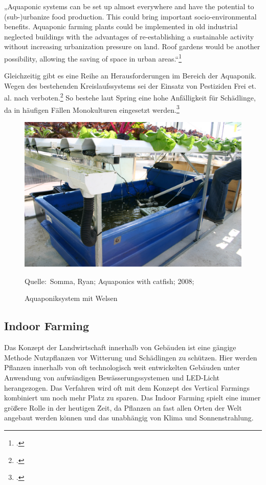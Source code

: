 \documentclass{scrartcl}
\newcommand*{\Bildquelle}[1]{\par\raggedleft\footnotesize Quelle:~#1}
\begin{document}
\begin{displayquote}
„Aquaponic systems can be set up almost everywhere and have the potential to (sub-)urbanize food production. This could bring important socio-environmental benefits. Aquaponic farming plants could be implemented in old industrial neglected buildings with the advantages of re-establishing a sustainable activity without increasing urbanization pressure on land. Roof gardens would be another possibility, allowing the saving of space in urban areas.“\footcites[S.4214]{Goddek2015ChallengesAquaponics}
\end{displayquote}
Gleichzeitig gibt es eine Reihe an Herausforderungen im Bereich der Aquaponik. Wegen des bestehenden Kreislaufssystems sei der Einsatz von Pestiziden Frei et. al. nach verboten.\footcite[S.43]{FreiMatthiasHartmann2007AquaponikGemuse.}  So bestehe laut Spring eine hohe Anfälligkeit für Schädlinge, da in häufigen Fällen Monokulturen eingesetzt werden.\footcite[S.27]{Spring2012DerBasel-Stadt} 


\begin{figure}[htbp]
\centering
\caption{Aquaponiksystem mit Welsen}
\includegraphics[width=12cm]{image_folder/Aquaponics_with_catfish.jpg}
\Bildquelle{Somma, Ryan; Aquaponics with catfish; 2008;}
\label{fig:aquaponik}
\end{figure}

\subsection{Indoor Farming}

Das Konzept der Landwirtschaft innerhalb von Gebäuden ist eine gängige Methode Nutzpflanzen vor Witterung und Schädlingen zu schützen. Hier werden Pflanzen innerhalb von oft technologisch weit entwickelten Gebäuden unter Anwendung von aufwändigen Bewässerungssystemen und LED-Licht herangezogen. Das Verfahren wird oft mit dem Konzept des Vertical Farmings kombiniert um noch mehr Platz zu sparen. Das Indoor Farming spielt eine immer größere Rolle in der heutigen Zeit, da Pflanzen an fast allen Orten der Welt angebaut werden können und das unabhängig von Klima und Sonnenstrahlung.
\end{document}
